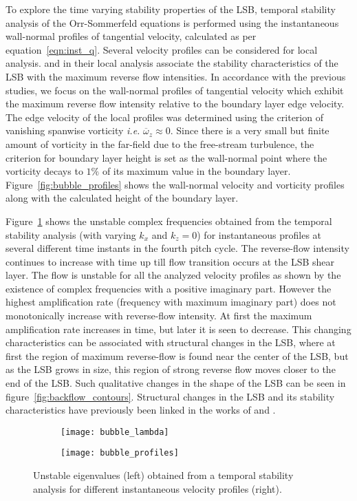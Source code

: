 To explore the time varying stability properties of the LSB, temporal stability analysis of the Orr-Sommerfeld equations is performed using the instantaneous wall-normal profiles of tangential velocity, calculated as per equation~\ref{eqn:inst_q}. Several velocity profiles can be considered for local analysis. \cite{alam00} and \cite{haggmark01b} in their local analysis associate the stability characteristics of the LSB with the maximum reverse flow intensities. In accordance with the previous studies, we focus on the wall-normal profiles of tangential velocity which exhibit the maximum reverse flow intensity relative to the boundary layer edge velocity. The edge velocity of the local profiles was determined using the criterion of vanishing spanwise vorticity \textit{i.e.} $\overline{\omega}_{z}\approx0$. Since there is a very small but finite amount of vorticity in the far-field due to the free-stream turbulence, the criterion for boundary layer height is set as the wall-normal point where the vorticity decays to $1\%$ of its maximum value in the boundary layer. Figure~\ref{fig:bubble_profiles} shows the wall-normal velocity and vorticity profiles along with the calculated height of the boundary layer.

Figure~\ref{fig:bubble_lambda} shows the unstable complex frequencies obtained from the temporal stability analysis (with varying $k_{x}$ and $k_{z}=0$) for instantaneous profiles at several different time instants in the fourth pitch cycle. The reverse-flow intensity continues to increase with time up till flow transition occurs at the LSB shear layer. The flow is unstable for all the analyzed velocity profiles as shown by the existence of complex frequencies with a positive imaginary part. However the highest amplification rate (frequency with maximum imaginary part) does not monotonically increase with reverse-flow intensity. At first the maximum amplification rate increases in time, but later it is seen to decrease. This changing characteristics can be associated with structural changes in the LSB, where at first the region of maximum reverse-flow is found near the center of the LSB, but as the LSB grows in size, this region of strong reverse flow moves closer to the end of the LSB. Such qualitative changes in the shape of the LSB can be seen in figure~\ref{fig:backflow_contours}. Structural changes in the LSB and its stability characteristics have previously been linked in the works of \cite{theofilis00,cherubini10} and \cite{rodriquez10}. 

\begin{figure}
	\centering
	\begin{subfigure}[t]{0.48\textwidth}
		\centering
		\texttt{[image: bubble\_lambda]}
	\end{subfigure}
	\begin{subfigure}[t]{0.48\textwidth}
		\centering
		\texttt{[image: bubble\_profiles]}
	\end{subfigure}
	\caption{Unstable eigenvalues (left) obtained from a temporal stability analysis for different instantaneous velocity profiles (right).}
	\label{fig:bubble_lambda}
\end{figure}

